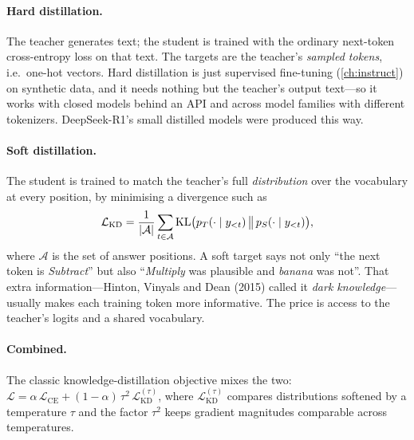 \paragraph{Hard distillation.} The teacher generates text; the student is trained with the
ordinary next-token cross-entropy loss on that text. The targets are the teacher's
\emph{sampled tokens}, i.e.\ one-hot vectors. Hard distillation is just supervised fine-tuning
(\cref{ch:instruct}) on synthetic data, and it needs nothing but the teacher's output text---so
it works with closed models behind an API and across model families with different
tokenizers. DeepSeek-R1's small distilled models were produced this way.

\paragraph{Soft distillation.} The student is trained to match the teacher's full
\emph{distribution} over the vocabulary at every position, by minimising a divergence such as
\begin{equation}
\mathcal{L}_{\text{KD}} = \frac{1}{|\mathcal{A}|}\sum_{t\in\mathcal{A}}
\operatorname{KL}\!\big(p_T(\cdot\mid y_{<t})\,\big\|\,p_S(\cdot\mid y_{<t})\big),
\label{eq:distill:kd}
\end{equation}
where $\mathcal{A}$ is the set of answer positions. A soft target says not only ``the next
token is \emph{Subtract}'' but also ``\emph{Multiply} was plausible and \emph{banana} was not''.
That extra information---Hinton, Vinyals and Dean (2015) called it \emph{dark
knowledge}---usually makes each training token more informative. The price is access to the
teacher's logits and a shared vocabulary.

\paragraph{Combined.} The classic knowledge-distillation objective mixes the two:
$\mathcal{L} = \alpha\,\mathcal{L}_{\text{CE}} + (1-\alpha)\,\tau^2\,\mathcal{L}_{\text{KD}}^{(\tau)}$,
where $\mathcal{L}_{\text{KD}}^{(\tau)}$ compares distributions softened by a temperature $\tau$
and the factor $\tau^2$ keeps gradient magnitudes comparable across temperatures.

